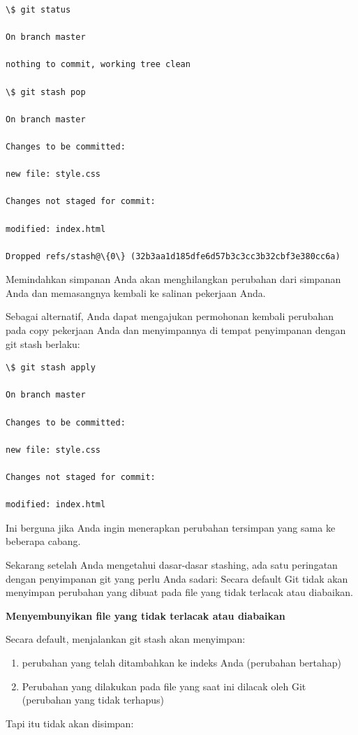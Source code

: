 \begin{verbatim}
\$ git status

On branch master

nothing to commit, working tree clean

\$ git stash pop

On branch master

Changes to be committed:

new file: style.css

Changes not staged for commit:

modified: index.html

Dropped refs/stash@\{0\} (32b3aa1d185dfe6d57b3c3cc3b32cbf3e380cc6a)
\end{verbatim}

Memindahkan simpanan Anda akan menghilangkan perubahan dari simpanan 
Anda dan memasangnya kembali ke salinan pekerjaan Anda.



Sebagai alternatif, Anda dapat mengajukan permohonan kembali perubahan 
pada copy pekerjaan Anda dan menyimpannya di tempat penyimpanan dengan 
git stash berlaku:

\begin{verbatim}
\$ git stash apply

On branch master

Changes to be committed:

new file: style.css

Changes not staged for commit:

modified: index.html

\end{verbatim}


Ini berguna jika Anda ingin menerapkan perubahan tersimpan yang sama ke 
beberapa cabang.

Sekarang setelah Anda mengetahui dasar-dasar stashing, ada satu 
peringatan dengan penyimpanan git yang perlu Anda sadari: Secara default 
Git tidak akan menyimpan perubahan yang dibuat pada file yang tidak 
terlacak atau diabaikan.

\textbf{Menyembunyikan file yang tidak terlacak atau diabaikan}

Secara default, menjalankan git stash akan menyimpan:

\begin{enumerate}
\item perubahan yang telah ditambahkan ke indeks Anda (perubahan 
bertahap)
\item Perubahan yang dilakukan pada file yang saat ini dilacak oleh Git 
(perubahan yang tidak terhapus)
\setcounter{numberedCntA}{\theenumi}
\end{enumerate}
Tapi itu tidak akan disimpan:

